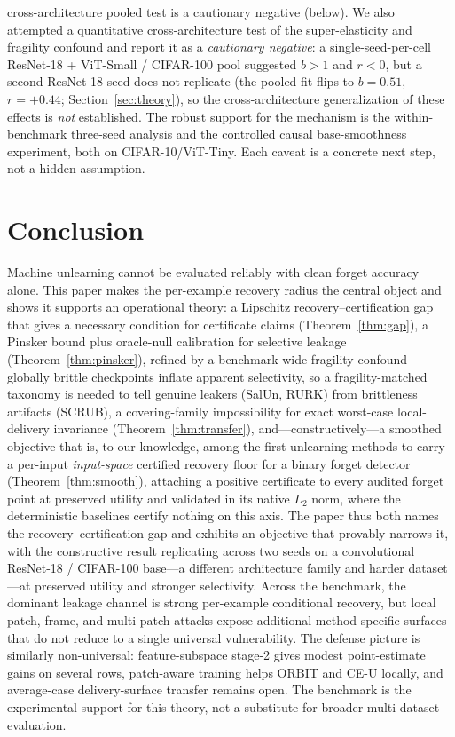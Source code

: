 \documentclass[11pt]{article}
\begin{document}
cross-architecture pooled test is a cautionary negative (below). We also attempted a quantitative cross-architecture test of the super-elasticity and fragility confound and report it as a \emph{cautionary negative}: a single-seed-per-cell ResNet-18 + ViT-Small / CIFAR-100 pool suggested $b>1$ and $r<0$, but a second ResNet-18 seed does not replicate (the pooled fit flips to $b{=}0.51$, $r{=}+0.44$; Section~\ref{sec:theory}), so the cross-architecture generalization of these effects is \emph{not} established. The robust support for the mechanism is the within-benchmark three-seed analysis and the controlled causal base-smoothness experiment, both on CIFAR-10/ViT-Tiny. Each caveat is a concrete next step, not a hidden assumption.

\FloatBarrier
\section{Conclusion}
Machine unlearning cannot be evaluated reliably with clean forget accuracy alone. This paper makes the per-example recovery radius the central object and shows it supports an operational theory: a Lipschitz recovery--certification gap that gives a necessary condition for certificate claims (Theorem~\ref{thm:gap}), a Pinsker bound plus oracle-null calibration for selective leakage (Theorem~\ref{thm:pinsker}), refined by a benchmark-wide fragility confound---globally brittle checkpoints inflate apparent selectivity, so a fragility-matched taxonomy is needed to tell genuine leakers (SalUn, RURK) from brittleness artifacts (SCRUB), a covering-family impossibility for exact worst-case local-delivery invariance (Theorem~\ref{thm:transfer}), and---constructively---a smoothed objective that is, to our knowledge, among the first unlearning methods to carry a per-input \emph{input-space} certified recovery floor for a binary forget detector (Theorem~\ref{thm:smooth}), attaching a positive certificate to every audited forget point at preserved utility and validated in its native $L_2$ norm, where the deterministic baselines certify nothing on this axis. The paper thus both names the recovery--certification gap and exhibits an objective that provably narrows it, with the constructive result replicating across two seeds on a convolutional ResNet-18 / CIFAR-100 base---a different architecture family and harder dataset---at preserved utility and stronger selectivity. Across the benchmark, the dominant leakage channel is strong per-example conditional recovery, but local patch, frame, and multi-patch attacks expose additional method-specific surfaces that do not reduce to a single universal vulnerability. The defense picture is similarly non-universal: feature-subspace stage-2 gives modest point-estimate gains on several rows, patch-aware training helps ORBIT and CE-U locally, and average-case delivery-surface transfer remains open. The benchmark is the experimental support for this theory, not a substitute for broader multi-dataset evaluation.
\end{document}
